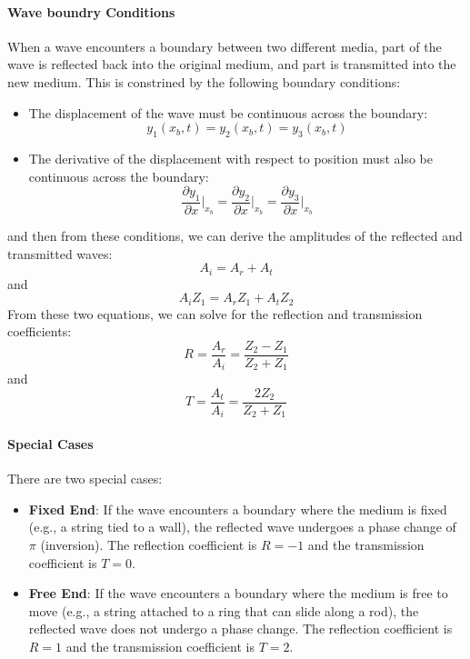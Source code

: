 \documentclass[11pt]{report}
\begin{document}
\paragraph{Wave boundry Conditions} When a wave encounters a boundary between two different media, part of the wave is reflected back into the original medium, and part is transmitted into the new medium. This is constrined by the following boundary conditions:
\begin{itemize}
    \item The displacement of the wave must be continuous across the boundary:
    \begin{equation}
        y_1(x_b, t) = y_2(x_b, t) = y_3(x_b, t)
    \end{equation}
    \item The derivative of the displacement with respect to position must also be continuous across the boundary:
    \begin{equation}
        \frac{\partial y_1}{\partial x}\bigg|_{x_b} = \frac{\partial y_2}{\partial x}\bigg|_{x_b} = \frac{\partial y_3}{\partial x}\bigg|_{x_b}
    \end{equation}
\end{itemize}
and then from these conditions, we can derive the amplitudes of the reflected and transmitted waves:
\begin{equation}
    A_i = A_r + A_t
\end{equation}
and 
\begin{equation}
    A_i Z_1 = A_r Z_1 + A_t Z_2
\end{equation}
From these two equations, we can solve for the reflection and transmission coefficients:
\begin{equation}
    R = \frac{A_r}{A_i} = \frac{Z_2 - Z_1}{Z_2 + Z_1}
\end{equation}
and
\begin{equation}
    T = \frac{A_t}{A_i} = \frac{2Z_2}{Z_2 + Z_1}
\end{equation}

\paragraph{Special Cases} There are two special cases:
\begin{itemize}
    \item \textbf{Fixed End}: If the wave encounters a boundary where the medium is fixed (e.g., a string tied to a wall), the reflected wave undergoes a phase change of \( \pi \) (inversion). The reflection coefficient is \( R = -1 \) and the transmission coefficient is \( T = 0 \).
    \item \textbf{Free End}: If the wave encounters a boundary where the medium is free to move (e.g., a string attached to a ring that can slide along a rod), the reflected wave does not undergo a phase change. The reflection coefficient is \( R = 1 \) and the transmission coefficient is \( T = 2 \).
\end{itemize}
\end{document}
